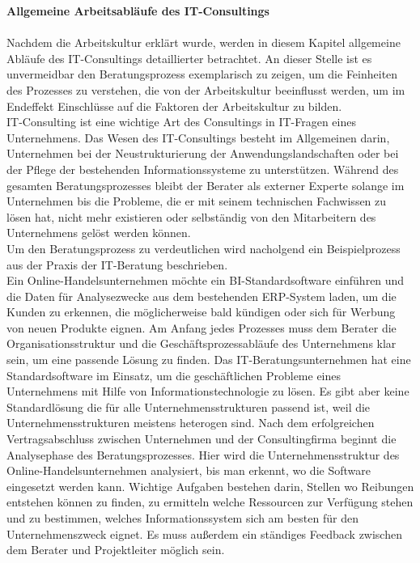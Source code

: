 \textbf{Allgemeine Arbeitsabläufe des IT-Consultings}\\ \\
	Nachdem die Arbeitskultur erklärt wurde, werden in diesem Kapitel allgemeine Abläufe des IT-Consultings detaillierter betrachtet. An dieser Stelle ist es unvermeidbar den Beratungsprozess exemplarisch zu zeigen, um die Feinheiten des Prozesses zu verstehen, die von der Arbeitskultur beeinflusst werden, um im Endeffekt Einschlüsse auf die Faktoren der Arbeitskultur zu bilden.\\ 
	IT-Consulting ist eine wichtige Art des Consultings in IT-Fragen eines Unternehmens. Das Wesen des IT-Consultings besteht im Allgemeinen darin, Unternehmen bei der Neustrukturierung der Anwendungslandschaften oder bei der Pflege der bestehenden Informationssysteme zu unterstützen. Während des gesamten Beratungsprozesses bleibt der Berater als externer Experte solange im Unternehmen bis die Probleme, die er mit seinem technischen Fachwissen zu lösen hat, nicht mehr existieren oder selbständig von den Mitarbeitern des Unternehmens gelöst werden können.\\
	Um den Beratungsprozess zu verdeutlichen wird nacholgend ein Beispielprozess aus der Praxis der IT-Beratung beschrieben. \\ Ein Online-Handelsunternehmen möchte ein BI-Standardsoftware einführen und die Daten für Analysezwecke aus dem bestehenden ERP-System laden, um die Kunden zu erkennen, die möglicherweise bald kündigen oder sich für Werbung von neuen Produkte eignen. Am Anfang jedes Prozesses muss dem Berater die Organisationsstruktur und die Geschäftsprozessabläufe des Unternehmens klar sein, um eine passende Lösung zu finden. Das IT-Beratungsunternehmen hat eine Standardsoftware im Einsatz, um die geschäftlichen Probleme eines Unternehmens mit Hilfe von Informationstechnologie zu lösen. Es gibt aber keine Standardlösung die für alle Unternehmensstrukturen passend ist, weil die Unternehmensstrukturen meistens heterogen sind. Nach dem erfolgreichen Vertragsabschluss zwischen Unternehmen und der Consultingfirma beginnt die Analysephase des Beratungsprozesses. Hier wird die Unternehmensstruktur des Online-Handelsunternehmen analysiert, bis man erkennt, wo die Software eingesetzt werden kann. Wichtige Aufgaben bestehen darin, Stellen wo Reibungen entstehen können zu finden, zu ermitteln welche Ressourcen zur Verfügung stehen und zu bestimmen, welches Informationssystem sich am besten für den Unternehmenszweck eignet. Es muss außerdem ein ständiges Feedback zwischen dem Berater und Projektleiter möglich sein.\\
